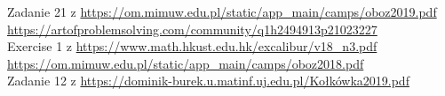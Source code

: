 
 Zadanie 21 z \url{https://om.mimuw.edu.pl/static/app_main/camps/oboz2019.pdf} \\
 \url{https://artofproblemsolving.com/community/q1h2494913p21023227} \\
 Exercise 1 z \url{https://www.math.hkust.edu.hk/excalibur/v18_n3.pdf} \\
 \url{https://om.mimuw.edu.pl/static/app_main/camps/oboz2018.pdf} \\
 Zadanie 12 z \url{https://dominik-burek.u.matinf.uj.edu.pl/Kołkówka2019.pdf} \\
